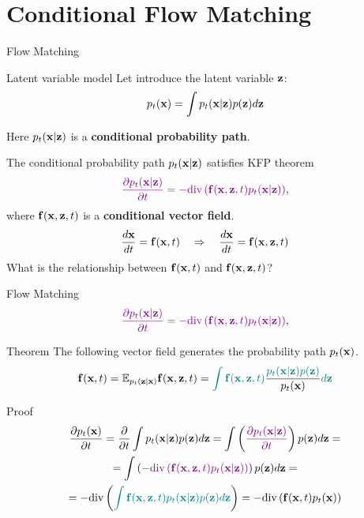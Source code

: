 \section{Conditional Flow Matching}
\begin{frame}{Flow Matching}
	\vspace{-0.5cm}
	\begin{block}{Latent variable model}
		Let introduce the latent variable $\mathbf{z}$:
		\[
			p_t(\mathbf{x}) = \int p_t(\mathbf{x} | \mathbf{z}) p(\mathbf{z}) d \mathbf{z} 
		\]
		\vspace{-0.5cm}
	\end{block}
	Here $p_t(\mathbf{x} | \mathbf{z})$ is a \textbf{conditional probability path}.
	
	The conditional probability path $p_t(\mathbf{x} | \mathbf{z})$ satisfies KFP theorem
	\[
		{\color{violet}\frac{\partial p_t(\mathbf{x} | \mathbf{z})}{\partial t} = - \text{div}\left(\mathbf{f}(\mathbf{x}, \mathbf{z}, t) p_t(\mathbf{x} | \mathbf{z})\right)},
	\]
	where $\mathbf{f}(\mathbf{x}, \mathbf{z}, t)$ is a \textbf{conditional vector field}.
	\[
		\frac{d\mathbf{x}}{dt} = \mathbf{f}(\mathbf{x}, t) \quad \Rightarrow \quad \frac{d\mathbf{x}}{dt} = \mathbf{f}(\mathbf{x}, \mathbf{z}, t)
	\]
	\vspace{-0.3cm}
	What is the relationship between $\mathbf{f}(\mathbf{x}, t)$ and $\mathbf{f}(\mathbf{x}, \mathbf{z}, t)$?
\end{frame}
\begin{frame}{Flow Matching}
	\[
		{\color{violet}\frac{\partial p_t(\mathbf{x} | \mathbf{z})}{\partial t} = - \text{div}\left(\mathbf{f}(\mathbf{x}, \mathbf{z}, t) p_t(\mathbf{x} | \mathbf{z})\right)},
	\]
	\vspace{-0.3cm}
	\begin{block}{Theorem}
		The following vector field generates the probability path $p_t(\mathbf{x})$.
		\vspace{-0.2cm}
		\[
			\mathbf{f}(\mathbf{x}, t) = \mathbb{E}_{p_t(\mathbf{z} | \mathbf{x})} \mathbf{f}(\mathbf{x}, \mathbf{z}, t)  = {\color{teal}\int \mathbf{f}(\mathbf{x}, \mathbf{z}, t)} \frac{\color{teal}p_t(\mathbf{x} | \mathbf{z}) p(\mathbf{z})}{p_t(\mathbf{x})} {\color{teal}d \mathbf{z}}
		\]
		\vspace{-0.5cm}
	\end{block}
	\begin{block}{Proof}
		\vspace{-0.7cm}
		\begin{multline*}
			\frac{\partial p_t(\mathbf{x})}{\partial t} = \frac{\partial}{\partial t} \int p_t(\mathbf{x} | \mathbf{z}) p(\mathbf{z}) d \mathbf{z} =  \int \left( {\color{violet} \frac{\partial p_t(\mathbf{x} | \mathbf{z})}{\partial t} } \right) p(\mathbf{z}) d \mathbf{z} = \\
			= \int \left( {\color{violet} - \text{div}\left(\mathbf{f}(\mathbf{x}, \mathbf{z}, t) p_t(\mathbf{x} | \mathbf{z})\right) } \right) p(\mathbf{z}) d \mathbf{z} = \\
			= - \text{div} \left({\color{teal}\int \mathbf{f}(\mathbf{x}, \mathbf{z}, t) p_t(\mathbf{x} | \mathbf{z}) p(\mathbf{z}) d \mathbf{z} }\right) = - \text{div}  \left(\mathbf{f}(\mathbf{x}, t) p_t(\mathbf{x})\right)
		\end{multline*}
	\end{block}
\end{frame}
